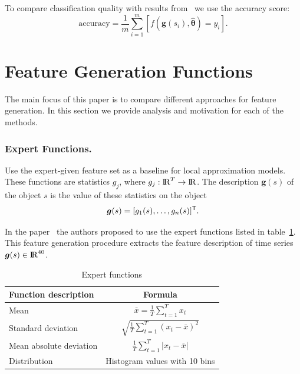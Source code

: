 \documentclass{llncs}
\newcommand{\T}{{\mbox{\scriptsize\sffamily\upshape\mdseries T}}}
\begin{document}
To compare classification quality with results from~\cite{karasikov2016feature,ivkin2015ts} we use the accuracy score:
\begin{equation}
	\mathrm{accuracy} = \frac{1}{m} \sum_{i=1}^{m} \left[f\left(\bm{g}(s_i), \hat{\bm{\theta}} \right)= y_i\right].
	\label{eq::accuracy}
\end{equation}

\section{Feature Generation Functions}

The main focus of this paper is to compare different approaches for feature generation. 
In this section we provide analysis and motivation for each of the methods.

\subsubsection{Expert Functions.}

Use the expert-given feature set as a baseline for local approximation models.
These functions are statistics $g_j$, where $g_j: {\rm I\!R}^T \rightarrow {\rm I\!R}$.
The description $\bm{g}(s)$ of the object $s$ is the value of these statistics on the object 
\[
\bm{g}(s) = [g_1(s), \dots, g_n(s)]^{\T}.
\]

In the paper~\cite{kwapisz2011activity} the authors proposed to use the expert functions listed in table~\ref{tbl::expert_functions}.
This feature generation procedure extracts the feature description of time series $\bm{g}(s) \in {\rm I\!R}^{40}$.

\begin{table}[h]
	\centering
	\caption{Expert functions}
	\begin{tabular}{|l|c|}
		\hline
		\textbf{Function description}    & \textbf{Formula} \\ \hline
		Mean                    & $\bar{x} = \frac{1}{T} \sum_{t=1}^{T} x_t$    \\ \hline
		Standard deviation      & $\sqrt{\frac{1}{T} \sum_{t=1}^{T} (x_t - \bar{x})^2}$    \\ \hline
		Mean absolute deviation & $\frac{1}{T} \sum_{t=1}^{T} |x_t - \bar{x}|$    \\ \hline
		Distribution            &  Histogram values with 10 bins    \\ \hline
	\end{tabular}
	\label{tbl::expert_functions}
\end{table}
\end{document}
